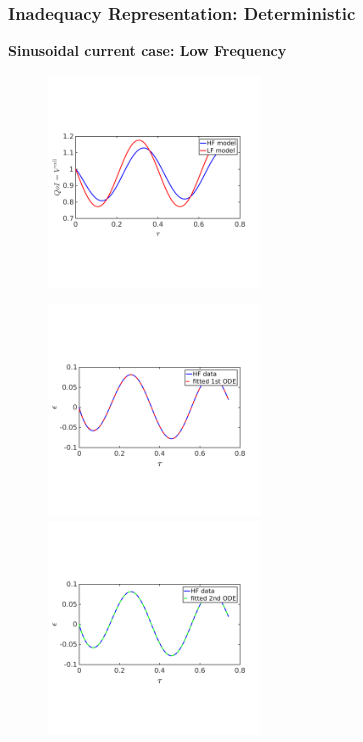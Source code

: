 \documentclass[10pt,xcolor=dvipsnames,compress]{beamer}
\begin{document}
\begin{frame}
\frametitle{Inadequacy Representation: Deterministic}
\textbf{Sinusoidal current case: Low Frequency}

\vfill

\begin{figure}
\includegraphics[trim = 0.in  2.3in 0.in 2.8in.in, clip, width=0.5\textwidth]{figs/Isin_low_V_hf_lf.png}
\end{figure}

\vspace{-0.1in}

\begin{figure}
\includegraphics[trim = 0.in  2.3in 0.in 2.8in, clip, width=0.5\textwidth]{figs/Isin_low_fitmodel_1st.png}
~
\includegraphics[trim = 0.in  2.3in 0.in 2.8in, clip, width=0.5\textwidth]{figs/Isin_low_fitmodel_2nd.png}
\end{figure}


\vfill
\end{frame}
\end{document}
